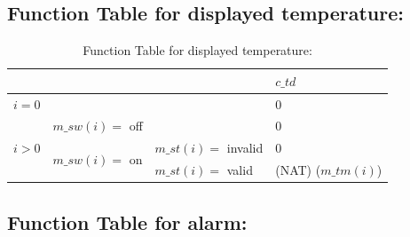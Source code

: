 \documentclass[fontsize=12pt,paper=letter,twoside]{scrartcl}
\begin{document}
\FloatBarrier
\subsection{Function Table for displayed temperature: }
\FloatBarrier

\begin{table}[htb!]
\centering
\label{my-label}
\begin{tabular}{lll|l|}
\cline{4-4}
                                                        &                                                     &                    & $c\_td$            \\ \hline
\multicolumn{3}{|l|}{$i = 0$}                                                                                                        & 0                \\ \hline
\multicolumn{1}{|l|}{\multirow{3}{*}{$i > 0$}} & \multicolumn{2}{l|}{$m\_sw(i) =$ off}                                      & 0                \\ \cline{2-4}
\multicolumn{1}{|l|}{}                                  & \multicolumn{1}{l|}{\multirow{2}{*}{$m\_sw(i) =$ on}} & $m\_st(i) =$ invalid & 0                \\ \cline{3-4}
\multicolumn{1}{|l|}{}                                  & \multicolumn{1}{l|}{}                               & $m\_st(i) =$ valid   & (NAT) ($m\_tm(i)$) \\ \hline
\end{tabular}
\caption{Function Table for displayed temperature: }
\end{table}

\FloatBarrier
\subsection{Function Table for alarm: }
\FloatBarrier
\end{document}
